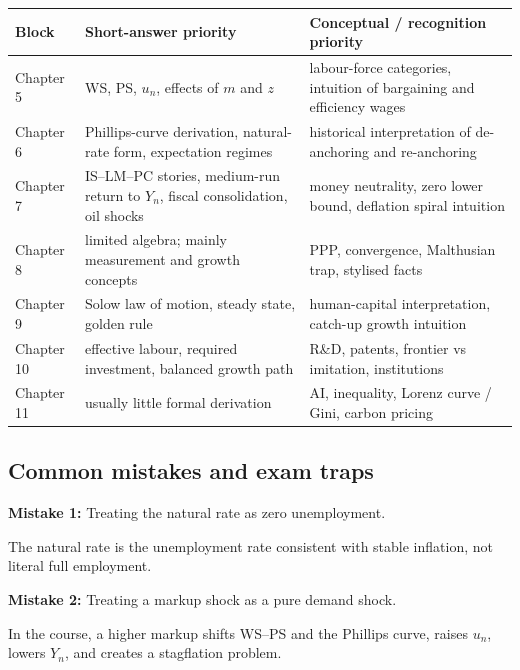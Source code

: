 \documentclass[12pt]{article}
\begin{document}
\begin{center}
\renewcommand{\arraystretch}{1.25}
\begin{tabularx}{\textwidth}{|p{2.1cm}|X|X|}
\hline
\textbf{Block} & \textbf{Short-answer priority} & \textbf{Conceptual / recognition priority} \\
\hline
Chapter 5 & WS, PS, \(u_n\), effects of \(m\) and \(z\) & labour-force categories, intuition of bargaining and efficiency wages \\
\hline
Chapter 6 & Phillips-curve derivation, natural-rate form, expectation regimes & historical interpretation of de-anchoring and re-anchoring \\
\hline
Chapter 7 & IS--LM--PC stories, medium-run return to \(Y_n\), fiscal consolidation, oil shocks & money neutrality, zero lower bound, deflation spiral intuition \\
\hline
Chapter 8 & limited algebra; mainly measurement and growth concepts & PPP, convergence, Malthusian trap, stylised facts \\
\hline
Chapter 9 & Solow law of motion, steady state, golden rule & human-capital interpretation, catch-up growth intuition \\
\hline
Chapter 10 & effective labour, required investment, balanced growth path & R\&D, patents, frontier vs imitation, institutions \\
\hline
Chapter 11 & usually little formal derivation & AI, inequality, Lorenz curve / Gini, carbon pricing \\
\hline
\end{tabularx}
\end{center}

\subsection{Common mistakes and exam traps}

\begin{commonmistake}
\textbf{Mistake 1:} Treating the natural rate as zero unemployment.

The natural rate is the unemployment rate consistent with stable inflation, not literal full employment.
\end{commonmistake}

\begin{commonmistake}
\textbf{Mistake 2:} Treating a markup shock as a pure demand shock.

In the course, a higher markup shifts WS--PS and the Phillips curve, raises \(u_n\), lowers \(Y_n\), and creates a stagflation problem.
\end{commonmistake}
\end{document}

